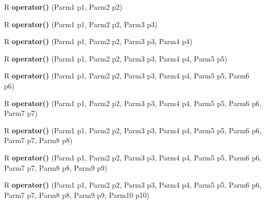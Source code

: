 \begin{DoxyCompactItemize}
\item 
\hypertarget{classutilspp_1_1Functor_a70021698a0ea099c4ede1c1c8bd31ad4}{R {\bfseries operator()} (Parm1 p1, Parm2 p2)}\label{classutilspp_1_1Functor_a70021698a0ea099c4ede1c1c8bd31ad4}

\item 
\hypertarget{classutilspp_1_1Functor_a19a69482d56402f234f4fedcab15a8d3}{R {\bfseries operator()} (Parm1 p1, Parm2 p2, Parm3 p3)}\label{classutilspp_1_1Functor_a19a69482d56402f234f4fedcab15a8d3}

\item 
\hypertarget{classutilspp_1_1Functor_a0ffc3b96e5a995fd6b39677d6f9e2a9e}{R {\bfseries operator()} (Parm1 p1, Parm2 p2, Parm3 p3, Parm4 p4)}\label{classutilspp_1_1Functor_a0ffc3b96e5a995fd6b39677d6f9e2a9e}

\item 
\hypertarget{classutilspp_1_1Functor_a51d835c88961a0f2cc163fdde77a67d7}{R {\bfseries operator()} (Parm1 p1, Parm2 p2, Parm3 p3, Parm4 p4, Parm5 p5)}\label{classutilspp_1_1Functor_a51d835c88961a0f2cc163fdde77a67d7}

\item 
\hypertarget{classutilspp_1_1Functor_a53c6b262b5dff629e8f0eb8d452bb9ed}{R {\bfseries operator()} (Parm1 p1, Parm2 p2, Parm3 p3, Parm4 p4, Parm5 p5, Parm6 p6)}\label{classutilspp_1_1Functor_a53c6b262b5dff629e8f0eb8d452bb9ed}

\item 
\hypertarget{classutilspp_1_1Functor_ad23373e50777351bcbe55530eff1450e}{R {\bfseries operator()} (Parm1 p1, Parm2 p2, Parm3 p3, Parm4 p4, Parm5 p5, Parm6 p6, Parm7 p7)}\label{classutilspp_1_1Functor_ad23373e50777351bcbe55530eff1450e}

\item 
\hypertarget{classutilspp_1_1Functor_aea3a0677a840ff772a23a1acdb7903dc}{R {\bfseries operator()} (Parm1 p1, Parm2 p2, Parm3 p3, Parm4 p4, Parm5 p5, Parm6 p6, Parm7 p7, Parm8 p8)}\label{classutilspp_1_1Functor_aea3a0677a840ff772a23a1acdb7903dc}

\item 
\hypertarget{classutilspp_1_1Functor_a8baf7f11731c14c4b665096050bf80e8}{R {\bfseries operator()} (Parm1 p1, Parm2 p2, Parm3 p3, Parm4 p4, Parm5 p5, Parm6 p6, Parm7 p7, Parm8 p8, Parm9 p9)}\label{classutilspp_1_1Functor_a8baf7f11731c14c4b665096050bf80e8}

\item 
\hypertarget{classutilspp_1_1Functor_a32472ed540582980ad17b4473414204e}{R {\bfseries operator()} (Parm1 p1, Parm2 p2, Parm3 p3, Parm4 p4, Parm5 p5, Parm6 p6, Parm7 p7, Parm8 p8, Parm9 p9, Parm10 p10)}\label{classutilspp_1_1Functor_a32472ed540582980ad17b4473414204e}


\end{DoxyCompactItemize}
